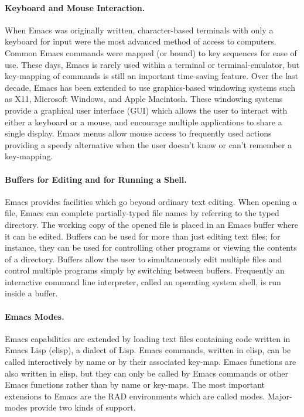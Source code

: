 \documentclass{article}
\begin{document}
\paragraph{Keyboard and Mouse Interaction.}
When Emacs was originally written, character-based terminals with only
a keyboard for input were the most advanced method of access to
computers.  Common Emacs commands were mapped (or bound) to key
sequences for ease of use.  These days, Emacs is
rarely used within a terminal or terminal-emulator, but key-mapping of
commands is still an important time-saving feature.  Over the last
decade, Emacs has been extended to use graphics-based windowing
systems such as X11, Microsoft Windows, and Apple Macintosh.  These
windowing systems provide a graphical user interface (GUI) which
allows the user to interact with either a keyboard or a mouse, and 
encourage multiple applications to share a single display.  Emacs 
menus allow mouse access to frequently used actions providing a
speedy alternative when the user doesn't know or can't remember 
a key-mapping.  

\paragraph{Buffers for Editing and for Running a Shell.}
Emacs provides facilities which go beyond ordinary text editing.  When
opening a file, Emacs can complete partially-typed file names by
referring to the typed directory.  The working copy of the opened file 
is placed in an Emacs buffer where it can be edited.  Buffers can be 
used for more than just editing text files; for instance, they can be 
used for controlling other programs or viewing the contents of a directory.  
Buffers allow the user to simultaneously edit multiple files and control 
multiple programs simply by switching between buffers.  Frequently an 
interactive command line interpreter, called an operating system shell, 
is run inside a buffer.

\paragraph{Emacs Modes.}
Emacs capabilities are extended by loading text files containing code
written in Emacs Lisp (elisp), a dialect of Lisp.  Emacs commands, 
written in elisp, can be called interactively by name or by their associated 
key-map.  Emacs functions are also written in elisp, but they can only be 
called by Emacs commands or other Emacs functions rather than by
name or key-maps.  The most important extensions to Emacs are the RAD
environments which are called modes.  Major-modes provide two kinds of support.  
\end{document}
